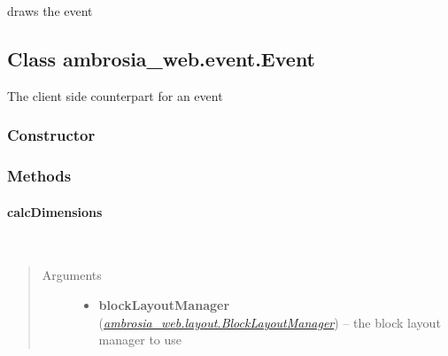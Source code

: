 \documentclass[letterpaper,10pt,english]{sphinxmanual}
\begin{document}
draws the event


\subsection{Class ambrosia\_web.event.Event}
\label{ambrosia_web.event.Event:class-ambrosia-web-event-event}\label{ambrosia_web.event.Event::doc}
The client side counterpart for an event




{\hyperref[ambrosia.model:ambrosia.model.Event]{}}




\subsubsection{Constructor}
\label{ambrosia_web.event.Event:constructor}

\begin{fulllineitems}
\label{ambrosia_web.event.Event:ambrosia_web.event.Event}
\end{fulllineitems}



\subsubsection{Methods}
\label{ambrosia_web.event.Event:methods}

\paragraph{calcDimensions}
\label{ambrosia_web.event.Event:calcdimensions}

\begin{fulllineitems}
\label{ambrosia_web.event.Event:ambrosia_web.event.Event.calcDimensions}~\begin{quote}\begin{description}
\item[{Arguments}] \leavevmode\begin{itemize}
\item {} 
\textbf{blockLayoutManager} ({\hyperref[ambrosia_web.layout.BlockLayoutManager:ambrosia_web.layout.BlockLayoutManager]{\emph{ambrosia\_web.layout.BlockLayoutManager}}}) -- the block layout manager to use

\end{itemize}

\end{description}\end{quote}

\end{fulllineitems}
\end{document}
